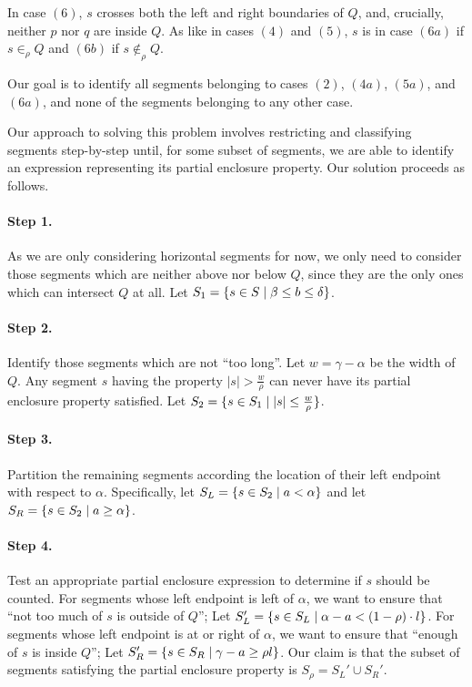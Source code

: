 In case $(6)$, $s$ crosses both the left and right boundaries of $Q$, and, crucially, neither $p$ nor $q$ are inside $Q$. As like in cases $(4)$ and $(5)$, $s$ is in case $(6a)$ if $s \in_\rho Q$ and $(6b)$ if $s \not \in_\rho Q$.

Our goal is to identify all segments belonging to cases $(2)$, $(4a)$, $(5a)$, and $(6a)$, and none of the segments belonging to any other case.

Our approach to solving this problem involves restricting and classifying segments step-by-step until, for some subset of segments, we are able to identify an expression representing its partial enclosure property.  Our solution proceeds as follows.

\paragraph{Step 1.} As we are only considering horizontal segments for now, we only need to consider those segments which are neither above nor below $Q$, since they are the only ones which can intersect $Q$ at all. Let $S_1 = \{ s \in S \;|\; \beta \leq b \leq \delta\}$. 

\paragraph{Step 2.} Identify those segments which are not ``too long''.  Let $w = \gamma - \alpha$ be the width of $Q$.  Any segment $s$ having the property $|s| > \frac{w}{\rho}$ can never have its partial enclosure property satisfied.
Let $S_2 = \{ s \in S_1 \;|\; |s| \leq \frac{w}{\rho} \}$.

\paragraph{Step 3.} Partition the remaining segments according the location of their left endpoint with respect to $\alpha$.
Specifically, let $S_L = \{s \in S_2 \;|\; a < \alpha \}$ and let $S_R = \{ s \in S_2 \;|\; a \geq \alpha \}$.

\paragraph{Step 4.} Test an appropriate partial enclosure expression to determine if $s$ should be counted.
For segments whose left endpoint is left of $\alpha$, we want to ensure that ``not too much of $s$ is outside of $Q$''; Let $S_L' = \{ s \in S_L \;|\; \alpha - a < (1 - \rho) \cdot l\}$.
For segments whose left endpoint is at or right of $\alpha$, we want to ensure that ``enough of $s$ is inside $Q$''; Let $S_R' = \{ s \in S_R \;|\; \gamma - a \geq  \rho l \}$.
Our claim is that the subset of segments satisfying the partial enclosure property is $S_\rho = S_L' \cup S_R'$. 

